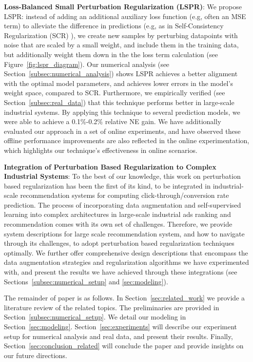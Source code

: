 \noindent \textbf{Loss-Balanced Small Perturbation Regularization (LSPR)}:
We propose LSPR: instead of adding an additional auxiliary loss function (e.g, often an MSE term) to alleviate the difference in predictions (e.g, as in Self-Consistency Regularization (SCR) ), we create new samples by perturbing datapoints with noise that are scaled by a small weight, and include them in the training data, but additionally weight them down in the the loss term calculation (see Figure~\ref{fig:lspr_diagram}).
Our numerical analysis (see Section~\ref{subsec:numerical_analysis}) shows LSPR achieves a better alignment with the optimal model parameters, and achieves lower errors in the model's weight space, compared to SCR.
Furthermore, we empirically verified (see Section~\ref{subsec:real_data}) that this technique performs better in large-scale industrial systems.
By applying this technique to several prediction models, we were able to achieve a 0.1\%-0.2\% relative NE gain.
We have additionally evaluated our approach in a set of online experiments, and have observed these offline performance improvements are also reflected in the online experimentation, which highlights our technique's effectiveness in online scenarios.

\noindent \textbf{Integration of Perturbation Based Regularization to Complex Industrial Systems}: 
To the best of our knowledge, this work on perturbation based regularization has been the first of its kind, to be integrated in industrial-scale recommendation systems for computing click-through/conversion rate prediction.
The process of incorporating data augmentation and self-supervised learning into complex architectures in large-scale industrial ads ranking and recommendation comes with its own set of challenges. 
Therefore, we provide system descriptions for large scale recommendation system, and how to navigate through its challenges, to adopt perturbation based regularization techniques optimally.
We further offer comprehensive design descriptions that encompass the data augmentation strategies and regularization algorithms we have experimented with, and  present the results we have achieved through these integrations (see Sections~\ref{subsec:numerical_setup} and \ref{sec:modeling}).

The remainder of paper is as follows. In Section~\ref{sec:related_work} we provide a literature review of the related topics.
The preliminaries are provided in Section~\ref{subsec:numerical_setup}.
We detail our modeling in Section~\ref{sec:modeling}.
Section~\ref{sec:experiments} will describe our experiment setup for numerical analysis and real data, and present their results. Finally, Section~\ref{sec:conclusion_related} will conclude the paper and provide insights on our future directions.
